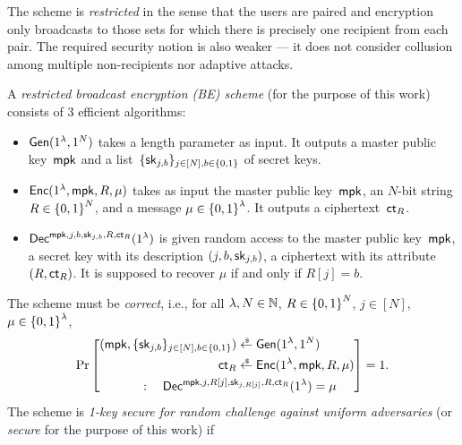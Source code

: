 The scheme is \emph{restricted} in the sense that the users are paired and encryption only broadcasts to those sets for which there is precisely one recipient from each pair.
The required security notion is also weaker --- it does not consider collusion among multiple non-recipients nor adaptive attacks.

\begin{definition}
A \emph{restricted broadcast encryption (BE) scheme} (for the purpose of this work) consists of 3 efficient algorithms:
\begin{itemize}
\item $\Gen(1^\lambda,1^N)$ takes a length parameter as input.
It outputs a master public key~$\mpk$ and
a list~$\{\sk_{j,b}\}_{j\in[N],b\in\bit}$ of secret keys.
\item $\Enc(1^\lambda,\mpk,R,\mu)$ takes as input
the master public key~$\mpk$,
an $N$-bit string ${R\in{\{0,1\}}^N}$, and
a message ${\mu\in{\{0,1\}}^\lambda}$.
It outputs a ciphertext~$\ct_R$.
\item $\Dec^{\mpk,j,b,\sk_{j,b},R,\ct_R}(1^\lambda)$
is given random access to
the master public key~$\mpk$,
a secret key with its description $(j,b,\sk_{j,b})$,
a ciphertext with its attribute $(R,\ct_R)$.
It is supposed to recover $\mu$ if and only if ${R[j]=b}$.
\end{itemize}
The scheme must be \emph{correct}, i.e., for all
${\lambda,N\in{\mathbb{N}}}$,
${R\in{\{0,1\}}^N}$,
${j\in[N]}$,
${\mu\in{\{0,1\}}^\lambda}$,
\begin{align*}
\Pr\left[\begin{aligned}
(\mpk,\{\sk_{j,b}\}_{j\in[N],b\in\bit})
&{}
\draws\Gen(1^\lambda,1^N)
\\
\ct_R
&{}
\draws\Enc(1^\lambda,\mpk,R,\mu)
\\
:\quad
\Dec^{\mpk,j,R[j],\sk_{j,R[j]},R,\ct_R}
(1^\lambda)=\mu
\hspace*{-8em}
&
\end{aligned}
\right]
=1.
\end{align*}
The scheme is \emph{1-key secure for random challenge against uniform adversaries} (or \emph{secure} for the purpose of this work) if
\begin{align*}

\end{align*}
\end{definition}
